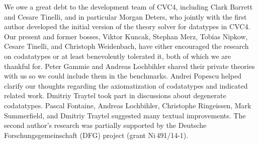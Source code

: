 
{\footnotesize
\def\ackname{Acknowledgment}
\ourparagraph{\footnotesize\ackname.}
We owe a great debt to the development team of CVC4,
including Clark Barrett and Cesare Tinelli,
and in particular Morgan Deters,
who jointly with the first author developed the initial version
of the theory solver for datatypes in CVC4.
%
Our present and former bosses, Viktor Kuncak, Stephan Merz, Tobias Nipkow,
Cesare Tinelli, and Christoph Weidenbach, have either encouraged the research on
codatatypes or at least benevolently tolerated it, both of which we are thankful
for.
%
Peter Gammie and Andreas Lochbihler shared their private
theories with us so we could include them in the benchmarks.
Andrei Popescu helped clarify our thoughts regarding the axiomatization of
codatatypes and indicated related work. Dmitriy Traytel took part in discussions
about degenerate codatatypes.
%
Pascal Fontaine, Andreas Lochbihler, Christophe Ringeissen, Mark Summerfield,
and Dmitriy Traytel suggested many textual improvements. The second author's
research was partially supported by the Deutsche Forschungs\-gemein\-schaft
(DFG) project  (grant Ni\,491\slash 14-1).

}


{}


